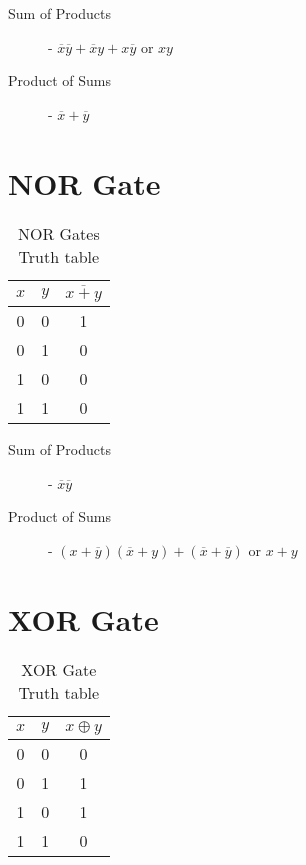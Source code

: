 \documentclass[12pt letter]{report}
\begin{document}
\begin{description}
  \item[Sum of Products]  - $\overline{x}\overline{y} + \overline{x}y + x\overline{y}$ or $xy$
  \item[Product of Sums] - $\overline{x} + \overline{y}$
\end{description}

\section{NOR Gate}

\begin{table}[h!]
  \caption{NOR Gates Truth table}\label{tab:nor}
  \begin{center}
    \begin{tabular}{|c c|c|}
      \hline
      $x$ & $y$ & $\overline{x + y}$ \\ [0.5ex]
      \hline
      \hline
      0   & 0   & 1                  \\
      0   & 1   & 0                  \\
      1   & 0   & 0                  \\
      1   & 1   & 0                  \\
      \hline
    \end{tabular}
  \end{center}
\end{table}

\begin{description}
  \item[Sum of Products]  - $\overline{x}\overline{y}$
  \item[Product of Sums] - $ \left( x + \overline{y} \right) \left( \overline{x} + y \right) + \left( \overline{x} +
          \overline{y} \right)   $ or $ x + y$
\end{description}

\section{XOR Gate}

\begin{table}[h!]
  \caption{XOR Gate Truth table}\label{tab:xor}
  \begin{center}
    \begin{tabular}{|c c|c|}
      \hline
      $x$ & $y$ & $x \oplus y$ \\ [0.5ex]
      \hline
      \hline
      0   & 0   & 0            \\
      0   & 1   & 1            \\
      1   & 0   & 1            \\
      1   & 1   & 0            \\
      \hline
    \end{tabular}
  \end{center}
\end{table}
\end{document}
